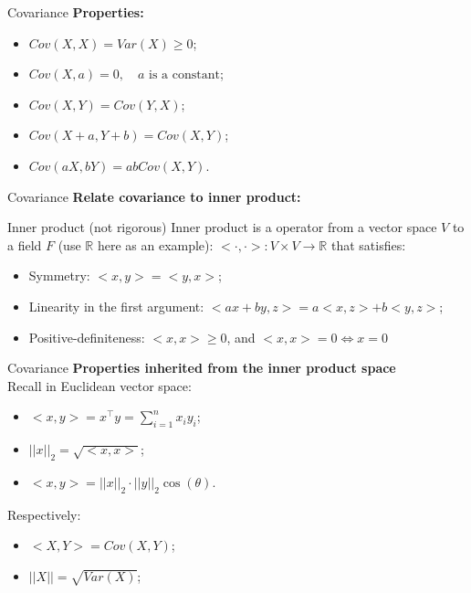 \documentclass [aspectratio=169]{beamer}
\begin{document}
\begin{frame}{Covariance}
    \textbf{Properties:}\\
    \begin{itemize}
        \item $Cov(X,X) = Var(X) \ge 0$;
        \item  $Cov(X,a) = 0, \quad a \text{ is a constant}$;
        \item $Cov(X,Y) = Cov(Y,X)$;
        \item $Cov(X + a,Y + b) = Cov(X,Y)$;
        \item $Cov(aX,bY) = abCov(X,Y)$.
    \end{itemize}
    \vspace{0.1in}
\end{frame}

\begin{frame}{Covariance}
    \textbf{Relate covariance to inner product:}\\
\begin{block}{Inner product (not rigorous)}
Inner product is a operator from a vector space $V$ to a field $F$ (use $\mathbb{R}$ here as an example): $<\cdot, \cdot>: V \times V \to \mathbb{R}$ that satisfies:
\begin{itemize}
    \item Symmetry: $<x, y> = <y, x>$;
    \item Linearity in the first argument: $<ax + by, z> = a<x, z> + b<y, z>$;
    \item Positive-definiteness: $<x,x>\ge 0$, and $<x, x> = 0 \Leftrightarrow x = 0$
\end{itemize}
\end{block}
\vspace{0.1in}
\end{frame}


\begin{frame}{Covariance}
\textbf{Properties inherited from the inner product space}\\
\vspace{0.1in}
Recall in Euclidean vector space:
\begin{itemize}
    \item  $<x, y> = x^\top y = \sum_{i = 1}^n x_iy_i$;
    \item $||x||_2 = \sqrt{<x,x>}$;
    \item $<x,y> = ||x||_2\cdot ||y||_2 \cos(\theta)$.
\end{itemize}
\vspace{0.1in}
Respectively:
\begin{itemize}
    \item  $<X, Y> = Cov(X, Y)$;
    \item $||X|| = \sqrt{Var(X)}$;
\end{itemize}
\end{frame}
\end{document}
